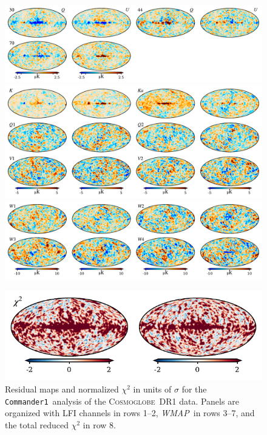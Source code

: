 \documentclass[twocolumn]{../../common/aa}
\def\WMAP{\emph{WMAP}}
\def\commanderone{\texttt{Commander1}}
\newcommand{\cosmoglobe}{\textsc{Cosmoglobe}}
\begin{document}
\begin{figure}
	\begin{center}
	\includegraphics[width=\linewidth]{figures/comm1_res_QU_LFI.pdf}\vspace{-0.3cm}
	\includegraphics[width=\linewidth]{figures/comm1_res_QU_K-V.pdf}\vspace{-0.3cm}
	\includegraphics[width=\linewidth]{figures/comm1_res_QU_W.pdf}\vspace{-0.3cm}
	\end{center}\vspace{-0.3cm}
	\includegraphics[width=0.5\linewidth]{figures/comm1_res_QU_chisq.pdf}
	\caption{Residual maps and normalized $\chi^2$ in units of $\sigma$ for the \commanderone\ analysis of the \cosmoglobe\ DR1 data. Panels are organized with LFI channels in rows 1--2, \WMAP\ in rows 3--7, and the total reduced $\chi^2$ in row 8.}
	\label{fig:res_QU}
\end{figure}
\end{document}
